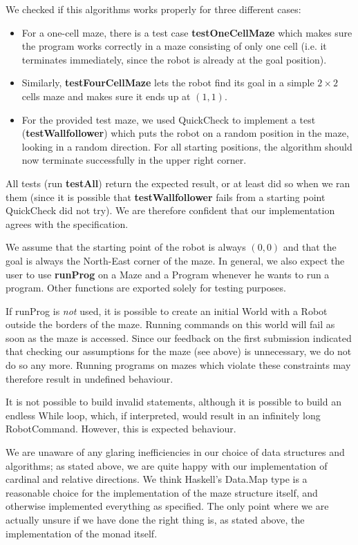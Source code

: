 \documentclass[a4paper]{article}
\begin{document}
We checked if this algorithms works properly for three different cases:

\begin{itemize}
  \item For a one-cell maze, there is a test case \textbf{testOneCellMaze} which makes sure the program works correctly in a maze consisting of only one cell (i.e. it terminates immediately, since the robot is already at the goal position).
  \item Similarly, \textbf{testFourCellMaze} lets the robot find its goal in a simple $2 \times 2$ cells maze and makes sure it ends up at $(1,1)$.
  \item For the provided test maze, we used QuickCheck to implement a test (\textbf{testWallfollower}) which puts the robot on a random position in the maze, looking in a random direction. For all starting positions, the algorithm should now terminate successfully in the upper right corner. 
\end{itemize}

All tests (run \textbf{testAll}) return the expected result, or at least did so when we ran them (since it is possible that \textbf{testWallfollower} fails from a starting point QuickCheck did not try). We are therefore confident that our implementation agrees with the specification.

We assume that the starting point of the robot is always $(0,0)$ and that the goal is always the North-East corner of the maze. In general, we also expect the user to use \textbf{runProg} on a Maze and a Program whenever he wants to run a program. Other functions are exported solely for testing purposes. 

If runProg is \emph{not} used, it is possible to create an initial World with a Robot outside the borders of the maze. Running commands on this world will fail as soon as the maze is accessed. Since our feedback on the first submission indicated that checking our assumptions for the maze (see above) is unnecessary, we do not do so any more. Running programs on mazes which violate these constraints may therefore result in undefined behaviour.

It is not possible to build invalid statements, although it is possible to build an endless While loop, which, if interpreted, would result in an infinitely long RobotCommand. However, this is expected behaviour.

We are unaware of any glaring inefficiencies in our choice of data structures and algorithms; as stated above, we are quite happy with our implementation of cardinal and relative directions. We think Haskell's Data.Map type is a reasonable choice for the implementation of the maze structure itself, and otherwise implemented everything as specified. The only point where we are actually unsure if we have done the right thing is, as stated above, the implementation of the monad itself. 
\end{document}
